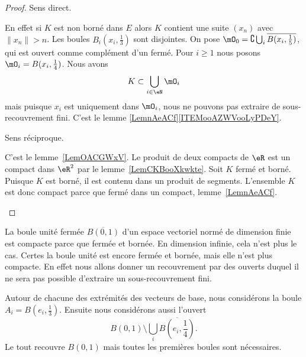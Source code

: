 \begin{proof}
	Sens direct.
	\begin{subproof}
		En effet si \( K\) est non borné dans \( E\) alors \( K\) contient une suite \( (x_n)\) avec \( \| x_n \|>n\). Les boules \( B_i(x_i,\frac{ 1 }{3})\) sont disjointes. On pose \( \mO_0=\complement\bigcup_i\overline{ B(x_i,\frac{1}{ 5 }) }\), qui est ouvert comme complément d'un fermé. Pour \( i\geq 1\) nous posons \( \mO_i=B(x_i,\frac{1}{ 4 })\). Nous avons
		\begin{equation}
			K\subset\bigcup_{i\in \eN}\mO_i
		\end{equation}
		mais puisque \( x_i\) est uniquement dans \( \mO_i\), nous ne pouvons pas extraire de sous-recouvrement fini.
		C'est le lemme \ref{LemnAeACf}\ref{ITEMooAZWVooLyPDeY}.
	\end{subproof}
	Sens réciproque.
	\begin{subproof}
		C'est le lemme~\ref{LemOACGWxV}.
		Le produit de deux compacts de \( \eR\) est un compact dans \( \eR^2\) par le lemme~\ref{LemCKBooXkwkte}.
		Soit \( K\) fermé et borné. Puisque \( K\) est borné, il est contenu dans un produit de segments. L'ensemble \( K\) est donc compact parce que fermé dans un compact, lemme~\ref{LemnAeACf}.
	\end{subproof}
\end{proof}

\begin{example}
	La boule unité fermée \( \overline{ B(0,1) }\) d'un espace vectoriel normé de dimension finie est compacte parce que fermée et bornée. En dimension infinie, cela n'est plus le cas. Certes la boule unité est encore fermée et bornée, mais elle n'est plus compacte. En effet nous allons donner un recouvrement par des ouverts duquel il ne sera pas possible d'extraire un sous-recouvrement fini.

	Autour de chacune des extrémités des vecteurs de base, nous considérons la boule \( A_i=B(e_i,\frac{1}{ 3 })\). Ensuite nous considérons aussi l'ouvert
	\begin{equation}
		B(0,1)\setminus\bigcup_i\overline{ B(e_i,\frac{1}{ 4 })}.
	\end{equation}
	Le tout recouvre \( B(0,1)\) mais toutes les premières boules sont nécessaires.
\end{example}

